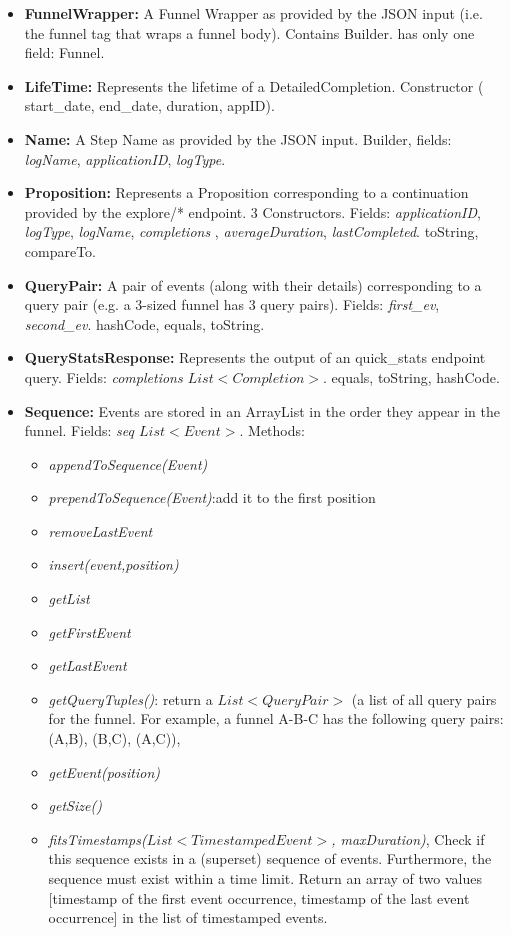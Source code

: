 \documentclass{article}
\begin{document}
\begin{itemize}
	\item \textbf{FunnelWrapper:} A Funnel Wrapper as provided by the JSON input (i.e. the funnel tag that wraps a funnel body).
	Contains Builder. has only one field: Funnel.
	\item \textbf{LifeTime:} Represents the lifetime of a DetailedCompletion. Constructor ( start\_date, end\_date, duration, appID).
	\item \textbf{Name:} A Step Name as provided by the JSON input. Builder, fields: \textit{logName}, \textit{applicationID}, \textit{logType}.
	\item \textbf{Proposition: } Represents a Proposition corresponding to a continuation provided by the  explore/* endpoint. 3 Constructors. Fields: \textit{applicationID}, \textit{logType}, \textit{logName}, \textit{completions}
	, \textit{averageDuration}, \textit{lastCompleted}. toString, compareTo.
	\item \textbf{QueryPair: } A pair of events (along with their details) corresponding to a query pair (e.g. a 3-sized funnel has 3 query pairs). Fields: \textit{first\_ev}, \textit{second\_ev}. hashCode, equals, toString.
	\item \textbf{QueryStatsResponse: }  Represents the output of an quick\_stats endpoint query. Fields: \textit{completions $List<Completion>$}. equals, toString, hashCode.
	\item \textbf{Sequence: }Events are stored in an ArrayList in the order they appear in the funnel. Fields: \textit{seq $List<Event>$}. Methods:
	\begin{itemize}
		\item\textit{appendToSequence(Event)} \item\textit{prependToSequence(Event)}:add it to the first position 
		\item\textit{removeLastEvent} \item\textit{insert(event,position)} 
		\item\textit{getList} 
		\item\textit{getFirstEvent} 
		\item\textit{getLastEvent}
		\item\textit{getQueryTuples()}: return a $List<QueryPair>$ (a list of all query pairs for the funnel. For example, a funnel A-B-C has the following query pairs: (A,B), (B,C), (A,C)),
		\item\textit{getEvent(position)}
		\item\textit{getSize()}
		\item\textit{fitsTimestamps($List<TimestampedEvent>$, maxDuration)}, Check if this sequence exists in a (superset) sequence of events. Furthermore, the sequence must exist within a time limit. Return an array of two values [timestamp of the first event occurrence, timestamp of the last event occurrence] in the list of timestamped events. 

\end{itemize}
\end{itemize}
\end{document}
